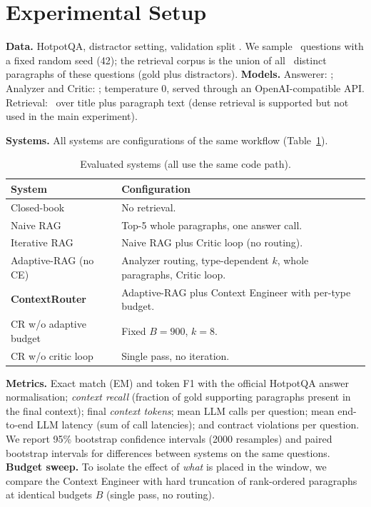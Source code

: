 \documentclass[conference]{IEEEtran}
\begin{document}
\section{Experimental Setup}
\textbf{Data.} HotpotQA, distractor setting, validation split \cite{yang2018hotpotqa}. We sample \nQ\ questions with a fixed
random seed (42); the retrieval corpus is the union of all \nPar\ distinct paragraphs of these questions (gold plus distractors).
\textbf{Models.} Answerer: \mainModel; Analyzer and Critic: \fastModel; temperature 0, served through an
OpenAI-compatible API. Retrieval: \retrKind\ over title plus paragraph text (dense retrieval
\cite{reimers2019sbert,johnson2021faiss} is supported but not used in the main experiment).

\textbf{Systems.} All systems are configurations of the same workflow (Table~\ref{tab:systems}).
\begin{table}[t]
\caption{Evaluated systems (all use the same code path).}
\label{tab:systems}
\centering
\small
\begin{tabular}{p{2.6cm}p{5.2cm}}
\toprule
System & Configuration \\
\midrule
Closed-book & No retrieval. \\
Naive RAG & Top-5 whole paragraphs, one answer call. \\
Iterative RAG & Naive RAG plus Critic loop (no routing). \\
Adaptive-RAG (no CE) & Analyzer routing, type-dependent $k$, whole paragraphs, Critic loop. \\
\textbf{ContextRouter} & Adaptive-RAG plus Context Engineer with per-type budget. \\
CR w/o adaptive budget & Fixed $B{=}900$, $k{=}8$. \\
CR w/o critic loop & Single pass, no iteration. \\
\bottomrule
\end{tabular}
\end{table}

\textbf{Metrics.} Exact match (EM) and token F1 with the official HotpotQA answer normalisation; \emph{context recall}
(fraction of gold supporting paragraphs present in the final context); final \emph{context tokens}; mean LLM calls per
question; mean end-to-end LLM latency (sum of call latencies); and contract violations per question. We report 95\%
bootstrap confidence intervals (2000 resamples) and paired bootstrap intervals for differences between systems on
the same questions. \textbf{Budget sweep.} To isolate the effect of \emph{what} is placed in the window, we compare
the Context Engineer with hard truncation of rank-ordered paragraphs at identical budgets $B$ (single pass, no
routing).
\end{document}
